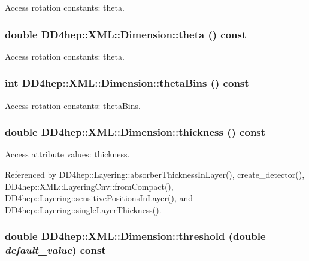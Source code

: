 Access rotation constants: theta. \hypertarget{struct_d_d4hep_1_1_x_m_l_1_1_dimension_ad7ba8d621c5b9d8814eb2133c7986519}{
\subsubsection[{theta}]{\setlength{\rightskip}{0pt plus 5cm}double DD4hep::XML::Dimension::theta () const}}
\label{struct_d_d4hep_1_1_x_m_l_1_1_dimension_ad7ba8d621c5b9d8814eb2133c7986519}


Access rotation constants: theta. \hypertarget{struct_d_d4hep_1_1_x_m_l_1_1_dimension_a9a371dba3c61c7e5957ad0177cda2248}{
\subsubsection[{thetaBins}]{\setlength{\rightskip}{0pt plus 5cm}int DD4hep::XML::Dimension::thetaBins () const}}
\label{struct_d_d4hep_1_1_x_m_l_1_1_dimension_a9a371dba3c61c7e5957ad0177cda2248}


Access rotation constants: thetaBins. \hypertarget{struct_d_d4hep_1_1_x_m_l_1_1_dimension_a3ef8d9614fde0917ebb5050b19515db0}{
\subsubsection[{thickness}]{\setlength{\rightskip}{0pt plus 5cm}double DD4hep::XML::Dimension::thickness () const}}
\label{struct_d_d4hep_1_1_x_m_l_1_1_dimension_a3ef8d9614fde0917ebb5050b19515db0}


Access attribute values: thickness. 

Referenced by DD4hep::Layering::absorberThicknessInLayer(), create\_\-detector(), DD4hep::XML::LayeringCnv::fromCompact(), DD4hep::Layering::sensitivePositionsInLayer(), and DD4hep::Layering::singleLayerThickness().\hypertarget{struct_d_d4hep_1_1_x_m_l_1_1_dimension_a05b7e800aefeec9945c59e2f7c25a1d2}{
\subsubsection[{threshold}]{\setlength{\rightskip}{0pt plus 5cm}double DD4hep::XML::Dimension::threshold (double {\em default\_\-value}) const}}
\label{struct_d_d4hep_1_1_x_m_l_1_1_dimension_a05b7e800aefeec9945c59e2f7c25a1d2}


